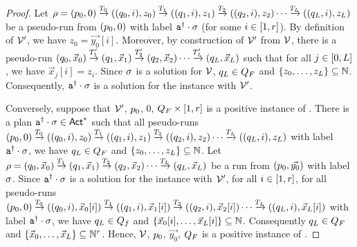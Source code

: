 \documentclass[envcountsame,a4paper,12pt]{llncs}
\begin{document}
\begin{proof}
Let $\arun = \pair{\alocationbis_0}{0} \step{\atransition_0} \pair{\pair{\alocation_0}{i}}{z_0}
\step{\atransition_1}
\pair{\pair{\alocation_1}{i}}{z_1} \step{\atransition_2}
\pair{\pair{\alocation_2}{i}}{z_2} \cdots
\step{\atransition_L}
\pair{\pair{\alocation_L}{i}}{z_L}$
be a pseudo-run from $(p_0,0)$
with label $\mathtt{a}^{\dag} \cdot \sigma$ (for some $i \in [1,r]$).
By definition of $\mathcal{V}'$, we have $z_0 = \vec{y_0}[i]$.
Moreover, by construction of $\mathcal{V}'$ from $\mathcal{V}$,
there is a pseudo-run
$\pair{\alocation_0}{\vec{x}_0} \step{\atransition_1'}
\pair{\alocation_1}{\vec{x}_1} \step{\atransition_2'}
\pair{\alocation_2}{\vec{x}_2} \cdots
\step{\atransition_L'}
\pair{\alocation_L}{\vec{x}_L}$
such that for all $j \in [0,L]$, we have $\vec{x}_j[i] = z_i$.
Since $\sigma$ is a solution for $\mathcal{V}$, $q_L \in Q_F$
and $\{ z_0,\ldots,z_L \} \subseteq \mathbb{N}$.
Consequently, $\mathtt{a}^{\dag} \cdot \sigma$ is a solution for the instance with $\mathcal{V}'$. 

Conversely, suppose that $\mathcal{V}'$, $p_0$, $0$, $Q_F \times [1,r]$
is a positive instance of \ourvasspb.
There is a plan $\mathtt{a}^{\dag} \cdot \sigma \in {\rm \sf Act}^*$  such that
all pseudo-runs
$\pair{\alocationbis_0}{0} \step{\atransition_0} \pair{\pair{\alocation_0}{i}}{z_0}
\step{\atransition_1}
\pair{\pair{\alocation_1}{i}}{z_1} \step{\atransition_2}
\pair{\pair{\alocation_2}{i}}{z_2} \cdots
\step{\atransition_L}
\pair{\pair{\alocation_L}{i}}{z_L}$
with label $\mathtt{a}^{\dag} \cdot \sigma$,
we have $q_L \in Q_F$ and
 $\{ z_0,\ldots,z_L \} \subseteq \mathbb{N}$.
Let 
$\arun = \pair{\alocation_0}{\vec{x}_0} \step{\atransition_1}
\pair{\alocation_1}{\vec{x}_1} \step{\atransition_2}
\pair{\alocation_2}{\vec{x}_2} \cdots
\step{\atransition_L}
\pair{\alocation_L}{\vec{x}_L}$
be a run from $(p_0,\vec{y_0})$ with label $\sigma$.
Since $\mathtt{a}^{\dag} \cdot \sigma$ is a solution for the instance with $\mathcal{V}'$,
for all $i \in [1,r]$, for all pseudo-runs 
$\pair{\alocationbis_0}{0} \step{\atransition_0} \pair{\pair{\alocation_0}{i}}{\vec{x}_0[i]}
\step{\atransition_1}
\pair{\pair{\alocation_1}{i}}{\vec{x}_1[i]} \step{\atransition_2}
\pair{\pair{\alocation_2}{i}}{\vec{x}_2[i]} \cdots
\step{\atransition_L}
\pair{\pair{\alocation_L}{i}}{\vec{x}_L[i]}$
with label $\mathtt{a}^{\dag} \cdot \sigma$,
we have $q_L \in Q_f$ and
$\{ \vec{x}_0[i],\ldots,\vec{x}_L[i] \} \subseteq \mathbb{N}$.
Consequently $q_L \in Q_F$ and $\{ \vec{x}_0,\ldots,\vec{x}_L \}
\subseteq \mathbb{N}^r$.
Hence, $\mathcal{V}$,
$p_0$, $\vec{y_0}$, $Q_F$
is a positive instance of \ourvasspb.
\end{proof}
\cut{

}
\end{document}
